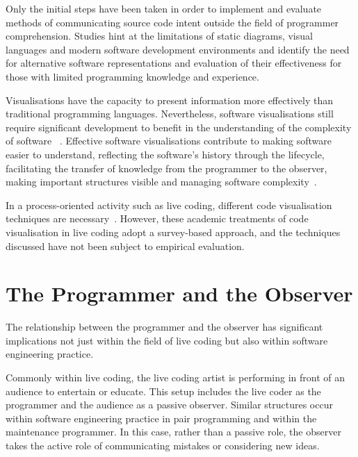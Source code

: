 Only the initial steps have been taken in order to implement and evaluate methods of communicating source code intent outside the field of programmer comprehension. Studies hint at the limitations of static diagrams, visual languages and modern software development environments and identify the need for alternative software representations and evaluation of their effectiveness for those with limited programming knowledge and experience. 

Visualisations have the capacity to present information more effectively than traditional programming languages. Nevertheless, software visualisations still require significant development to benefit in the understanding of the complexity of software ~\cite{Baecker1995}. Effective software visualisations contribute to making software easier to understand, reflecting the software's history through the lifecycle, facilitating the transfer of knowledge from the programmer to the observer, making important structures visible and managing software complexity~\cite{Baecker1995}.


In a process-oriented activity such as live coding, different code visualisation techniques are necessary~\cite{McLean2010a,Magnusson2013}. However, these academic treatments of code visualisation in live coding adopt a survey-based approach, and the techniques discussed have not been subject to empirical evaluation.

\section{The Programmer and the Observer}

The relationship between the programmer and the observer has significant implications not just within the field of live coding but also within software engineering practice.

Commonly within live coding, the live coding artist is performing in front of an audience to entertain or educate. This setup includes the live coder as the programmer and the audience as a passive observer. Similar structures occur within software engineering practice in pair programming and within the maintenance programmer. In this case, rather than a passive role, the observer takes the active role of communicating mistakes or considering new ideas.

